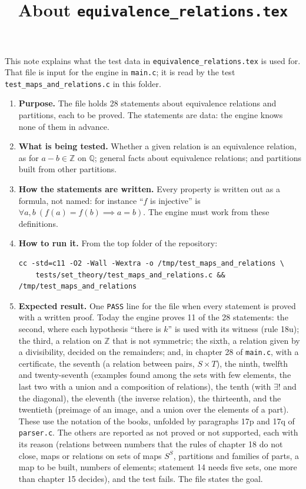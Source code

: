 \documentclass[11pt,a4paper]{article}
\title{About \texttt{equivalence\_relations.tex}}
\author{}
\date{}
\begin{document}
\maketitle
This note explains what the test data in \texttt{equivalence\_relations.tex} is used for. That file is input for the engine in \texttt{main.c}; it is read by the test \texttt{test\_maps\_and\_relations.c} in this folder.

\begin{enumerate}
\item \textbf{Purpose.} The file holds 28 statements about equivalence relations and partitions, each to be proved. The statements are data: the engine knows none of them in advance.

\item \textbf{What is being tested.} Whether a given relation is an equivalence relation, as for $a - b \in \mathbb{Z}$ on $\mathbb{Q}$; general facts about equivalence relations; and partitions built from other partitions.

\item \textbf{How the statements are written.} Every property is written out as a formula, not named: for instance ``$f$ is injective'' is $\forall a, b\ (f(a) = f(b) \implies a = b)$. The engine must work from these definitions.

\item \textbf{How to run it.} From the top folder of the repository:
\begin{verbatim}
cc -std=c11 -O2 -Wall -Wextra -o /tmp/test_maps_and_relations \
    tests/set_theory/test_maps_and_relations.c && /tmp/test_maps_and_relations
\end{verbatim}

\item \textbf{Expected result.} One \texttt{PASS} line for the file when every statement is proved with a written proof. Today the engine proves 11 of the 28 statements: the second, where each hypothesis ``there is $k$'' is used with its witness (rule 18u); the third, a relation on $\mathbb{Z}$ that is not symmetric; the sixth, a relation given by a divisibility, decided on the remainders; and, in chapter 28 of \texttt{main.c}, with a certificate, the seventh (a relation between pairs, $S \times T$), the ninth, twelfth and twenty-seventh (examples found among the sets with few elements, the last two with a union and a composition of relations), the tenth (with $\exists!$ and the diagonal), the eleventh (the inverse relation), the thirteenth, and the twentieth (preimage of an image, and a union over the elements of a part). These use the notation of the books, unfolded by paragraphs 17p and 17q of \texttt{parser.c}. The others are reported as not proved or not supported, each with its reason (relations between numbers that the rules of chapter 18 do not close, maps or relations on sets of maps $S^{S}$, partitions and families of parts, a map to be built, numbers of elements; statement 14 needs five sets, one more than chapter 15 decides), and the test fails. The file states the goal.
\end{enumerate}
\end{document}
